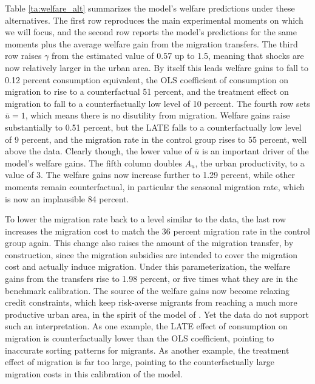 \documentclass[12pt,pdftex]{article}
\begin{document}
\begin{onehalfspacing}
Table \ref{ta:welfare_alt} summarizes the model's welfare predictions under these alternatives. The first row reproduces the main experimental moments on which we will focus, and the second row reports the model's predictions for the same moments plus the average welfare gain from the migration transfers. The third row raises $\gamma$ from the estimated value of 0.57 up to 1.5, meaning that shocks are now relatively larger in the urban area. By itself this leads welfare gains to fall to 0.12 percent consumption equivalent, the OLS coefficient of consumption on migration to rise to a counterfactual 51 percent, and the treatment effect on migration to fall to a counterfactually low level of 10 percent. The fourth row sets $\bar{u}=1$, which means there is no disutility from migration. Welfare gains raise substantially to 0.51 percent, but the LATE falls to a counterfactually low level of 9 percent, and the migration rate in the control group rises to 55 percent, well above the data. Clearly though, the lower value of $\bar{u}$ is an important driver of the model's welfare gains. The fifth column doubles $A_u$, the urban productivity, to a value of 3. The welfare gains now increase further to 1.29 percent, while other moments remain counterfactual, in particular the seasonal migration rate, which is now an implausible 84 percent.

To lower the migration rate back to a level similar to the data, the last row increases the migration cost to match the 36 percent migration rate in the control group again. This change also raises the amount of the migration transfer, by construction, since the migration subsidies are intended to cover the migration cost and actually induce migration. Under this parameterization, the welfare gains from the transfers rise to 1.98 percent, or five times what they are in the benchmark calibration. The source of the welfare gains now become relaxing credit constraints, which keep risk-averse migrants from reaching a much more productive urban area, in the spirit of the model of \citet{brch14}. Yet the data do not support such an interpretation. As one example, the LATE effect of consumption on migration is counterfactually lower than the OLS coefficient, pointing to inaccurate sorting patterns for migrants. As another example, the treatment effect of migration is far too large, pointing to the counterfactually large migration costs in this calibration of the model.






\end{onehalfspacing}
\end{document}
